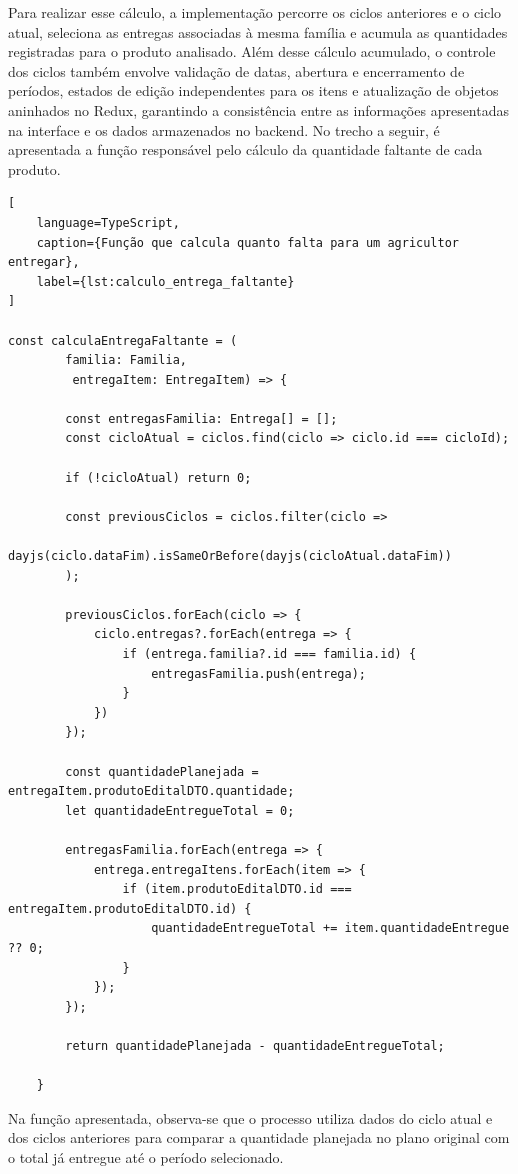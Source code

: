 Para realizar esse cálculo, a implementação percorre os ciclos anteriores e o ciclo atual, seleciona as entregas associadas à mesma família e acumula as quantidades registradas para o produto analisado. Além desse cálculo acumulado, o controle dos ciclos também envolve validação de datas, abertura e encerramento de períodos, estados de edição independentes para os itens e atualização de objetos aninhados no Redux, garantindo a consistência entre as informações apresentadas na interface e os dados armazenados no backend. No trecho a seguir, é apresentada a função responsável pelo cálculo da quantidade faltante de cada produto.

\begin{lstlisting}[
    language=TypeScript,
    caption={Função que calcula quanto falta para um agricultor entregar},
    label={lst:calculo_entrega_faltante}
]

const calculaEntregaFaltante = (
        familia: Familia,
         entregaItem: EntregaItem) => {

        const entregasFamilia: Entrega[] = [];
        const cicloAtual = ciclos.find(ciclo => ciclo.id === cicloId);

        if (!cicloAtual) return 0;

        const previousCiclos = ciclos.filter(ciclo =>
            dayjs(ciclo.dataFim).isSameOrBefore(dayjs(cicloAtual.dataFim))
        );

        previousCiclos.forEach(ciclo => {
            ciclo.entregas?.forEach(entrega => {
                if (entrega.familia?.id === familia.id) {
                    entregasFamilia.push(entrega);
                }
            })
        });

        const quantidadePlanejada = entregaItem.produtoEditalDTO.quantidade;
        let quantidadeEntregueTotal = 0;

        entregasFamilia.forEach(entrega => {
            entrega.entregaItens.forEach(item => {
                if (item.produtoEditalDTO.id === entregaItem.produtoEditalDTO.id) {
                    quantidadeEntregueTotal += item.quantidadeEntregue ?? 0;
                }
            });
        });

        return quantidadePlanejada - quantidadeEntregueTotal;

    }
\end{lstlisting}

Na função apresentada, observa-se que o processo utiliza dados do ciclo atual e dos ciclos anteriores para comparar a quantidade planejada no plano original com o total já entregue até o período selecionado.


